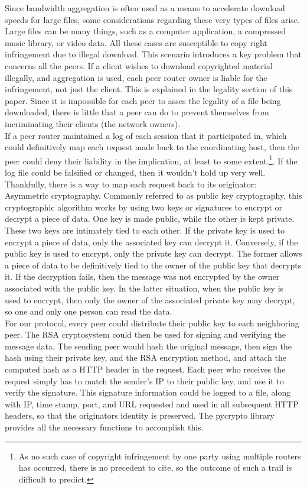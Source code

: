 \documentclass[12pt]{article}
\begin{document}
			Since bandwidth aggregation is often used as a means to accelerate download speeds for large files, some considerations regarding these very types of files arise. Large files can be many things, such as a computer application, a compressed music library, or video data. All these cases are susceptible to copy right infringement due to illegal download. This scenario introduces a key problem that concerns all the peers. If a client wishes to download copyrighted material illegally, and aggregation is used, each peer router owner is liable for the infringement, not just the client. This is explained in the legality section of this paper. Since it is impossible for each peer to asses the legality of a file being downloaded, there is little that a peer can do to prevent themselves from incriminating their clients (the network owners). \\

			If a peer router maintained a log of each session that it participated in, which could definitively map each request made back to the coordinating host, then the peer could deny their liability in the implication, at least to some extent.\footnote{As no such case of copyright infringement by one party using multiple routers has occurred, there is no precedent to cite, so the outcome of such a trail is difficult to predict.}. If the log file could be falsified or changed, then it wouldn't hold up very well. Thankfully, there is a way to map each request back to its originator: Asymmetric cryptography. Commonly referred to as public key cryptography, this cryptographic algorithm works by using two keys or signatures to encrypt or decrypt a piece of data. One key is made public, while the other is kept private. These two keys are intimately tied to each other. If the private key is used to encrypt a piece of data, only the associated key can decrypt it. Conversely, if the public key is used to encrypt, only the private key can decrypt. The former allows a piece of data to be definitively tied to the owner of the public key that decrypts it. If the decryption fails, then the message was not encrypted by the owner associated with the public key. In the latter situation, when the public key is used to encrypt, then only the owner of the associated private key may decrypt, so one and only one person can read the data.\\

			For our protocol, every peer could distribute their public key to each neighboring peer. The RSA cryptosystem could then be used for signing and verifying the message data. The sending peer would hash the original message, then sign the hash using their private key, and the RSA encryption method, and attach the computed hash as a HTTP header in the request. Each peer who receives the request simply has to match the sender's IP to their public key, and use it to verify the signature. This signature information could be logged to a file, along with IP, time stamp, port, and URL requested and used in all subsequent HTTP headers, so that the originators identity is preserved. The pycrypto library provides all the necessary functions to accomplish this.\\
\end{document}
